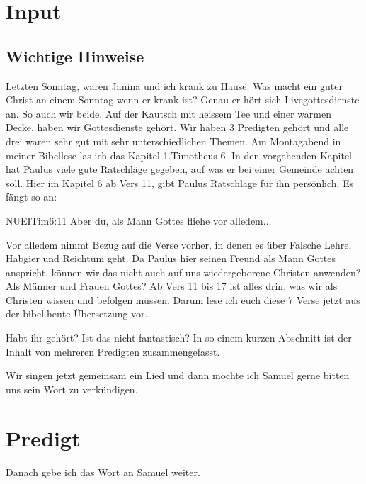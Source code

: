\documentclass{../inc/mybib}
\begin{document}
\section{ Input }
\begin{spacing}{1.5}
\subsection{ Wichtige Hinweise }

Letzten Sonntag, waren Janina und ich krank zu Hause. Was macht ein guter Christ an einem Sonntag wenn er krank ist? Genau er hört sich Livegottesdienste an. So auch wir beide. Auf der Kautsch mit heissem Tee und einer warmen Decke, haben wir Gottesdienste gehört. Wir haben 3 Predigten gehört und alle drei waren sehr gut mit sehr unterschiedlichen Themen. Am Montagabend in meiner Bibellese las ich das Kapitel 1.Timotheus 6. In den vorgehenden Kapitel hat Paulus viele gute Ratschläge gegeben, auf was er bei einer Gemeinde achten soll. Hier im Kapitel 6 ab Vers 11, gibt Paulus Ratschläge für ihn persönlich. Es fängt so an:

\begin{bibelbox}{NUE}{ITim}{6:11}
Aber du, als Mann Gottes fliehe vor alledem...
\end{bibelbox}

 \glqq Vor alledem \grqq{} nimmt Bezug auf die Verse vorher, in denen es über Falsche Lehre, Habgier und Reichtum geht. Da Paulus hier seinen Freund als Mann Gottes anspricht, können wir das nicht auch auf uns wiedergeborene Christen anwenden? Als Männer und Frauen Gottes? Ab Vers 11 bis 17 ist alles drin, was wir als Christen wissen und befolgen müssen. Darum lese ich euch diese 7 Verse jetzt aus der bibel.heute Übersetzung vor.

Habt ihr gehört? Ist das nicht fantastisch? In so einem kurzen Abschnitt ist der Inhalt von mehreren Predigten zusammengefasst. 

Wir singen jetzt gemeinsam ein Lied und dann möchte ich Samuel gerne bitten uns sein Wort zu verkündigen.

\end{spacing}


\section{Predigt}

Danach gebe ich das Wort an Samuel weiter.
\end{document}
